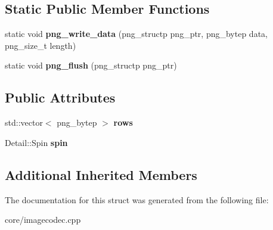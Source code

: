 \subsection*{Static Public Member Functions}
\begin{DoxyCompactItemize}
\item 
\hypertarget{struct_tempest_1_1_png_codec_a2a9f2b8af71eee611b391e7f9b2e5d34}{static void {\bfseries png\+\_\+write\+\_\+data} (png\+\_\+structp png\+\_\+ptr, png\+\_\+bytep data, png\+\_\+size\+\_\+t length)}\label{struct_tempest_1_1_png_codec_a2a9f2b8af71eee611b391e7f9b2e5d34}

\item 
\hypertarget{struct_tempest_1_1_png_codec_ab321ce9aff1409ff603bee5ea06ee20d}{static void {\bfseries png\+\_\+flush} (png\+\_\+structp png\+\_\+ptr)}\label{struct_tempest_1_1_png_codec_ab321ce9aff1409ff603bee5ea06ee20d}

\end{DoxyCompactItemize}
\subsection*{Public Attributes}
\begin{DoxyCompactItemize}
\item 
\hypertarget{struct_tempest_1_1_png_codec_ac9831c08784090193b72107ba1195ac4}{std\+::vector$<$ png\+\_\+bytep $>$ {\bfseries rows}}\label{struct_tempest_1_1_png_codec_ac9831c08784090193b72107ba1195ac4}

\item 
\hypertarget{struct_tempest_1_1_png_codec_a8964fcad5ad0a258d6da7abae6223a40}{Detail\+::\+Spin {\bfseries spin}}\label{struct_tempest_1_1_png_codec_a8964fcad5ad0a258d6da7abae6223a40}

\end{DoxyCompactItemize}
\subsection*{Additional Inherited Members}


The documentation for this struct was generated from the following file\+:\begin{DoxyCompactItemize}
\item 
core/imagecodec.\+cpp\end{DoxyCompactItemize}
